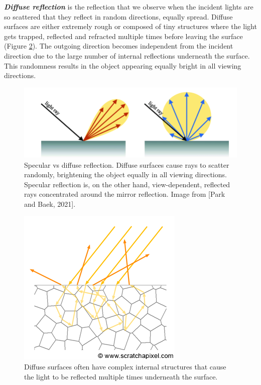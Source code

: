 

\textbf{\textit{Diffuse reflection}} is the reflection that we observe when the incident lights are so scattered that they reflect in random directions, equally spread. Diffuse surfaces are either extremely rough or composed of tiny structures where the light gets trapped, reflected and refracted multiple times before leaving the surface (Figure \ref{fig:diffuse-scattering}). The outgoing direction becomes independent from the incident direction due to the large number of internal reflections underneath the surface. This randomness results in the object appearing equally bright in all viewing directions. 

\begin{figure}[ht]
  \centering
   \includegraphics[width=\linewidth]{Images/Differences-between-the-specular-and-diffuse-reflections-specuclar-reflections-occur-on.png}
   \caption{Specular vs diffuse reflection. Diffuse surfaces cause rays to scatter randomly, brightening the object equally in all viewing directions. Specular reflection is, on the other hand, view-dependent, reflected rays concentrated around the mirror reflection. Image from [Park and Baek, 2021].}
   \label{fig:specularvsdiffuse}
\end{figure}

\begin{figure}
  \centering
\includegraphics[width=0.5\linewidth]{Images/shad-diffuse1.png}
   \caption{Diffuse surfaces often have complex internal structures that cause the light to be reflected multiple times underneath the surface.}
   \label{fig:diffuse-scattering}
\end{figure}

